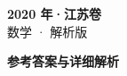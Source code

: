 \documentclass[zihao=-4, a4paper]{ctexart}
\begin{document}
\begin{center}
  {\Large\bfseries 2020 年·江苏卷}\\[4pt]
  {\large 数学 · 解析版}
\end{center}
\medskip
{}

\clearpage
{}
\begin{center}{\Large\bfseries 参考答案与详细解析}\end{center}
\medskip

\end{document}
